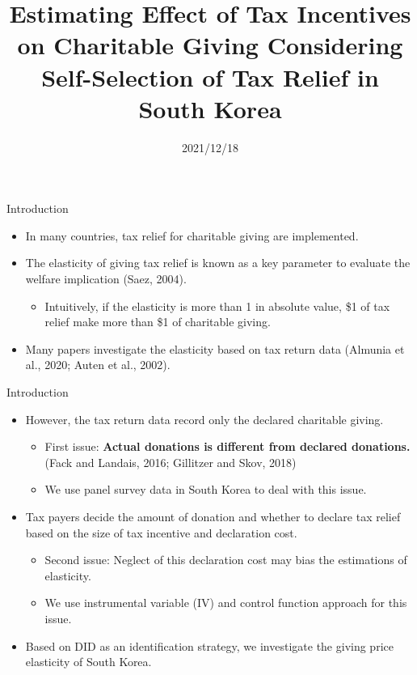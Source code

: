 \documentclass[
  ignorenonframetext,
  aspectratio=169,
]{beamer}
\title{Estimating Effect of Tax Incentives on Charitable Giving Considering Self-Selection of Tax Relief in South Korea  }
\author[shortname]{ Hiroki Kato \inst{1} \and  Tsuyoshi Goto \inst{2} \and  Yong-Rok Kim \inst{3} \and }
\institute[shortinst]{ \inst{1} Osaka University \and  \inst{2} Chiba University \and  \inst{3} Kansai University \and }
\date{2021/12/18}
\providecommand{\tightlist}{%
  \setlength{\itemsep}{0pt}\setlength{\parskip}{0pt}}
\begin{document}
\frame{\titlepage}

\begin{frame}{Introduction}
\protect\hypertarget{introduction}{}
\begin{itemize}
\tightlist
\item
  In many countries, tax relief for charitable giving are implemented.
\item
  The elasticity of giving tax relief is known as a key parameter to evaluate the welfare implication (Saez, 2004).

  \begin{itemize}
  \tightlist
  \item
    Intuitively, if the elasticity is more than 1 in absolute value, \$1 of tax relief make more than \$1 of charitable giving.
  \end{itemize}
\item
  Many papers investigate the elasticity based on tax return data (Almunia et al., 2020; Auten et al., 2002).
\end{itemize}
\end{frame}

\begin{frame}{Introduction}
\protect\hypertarget{introduction-1}{}
\begin{itemize}
\tightlist
\item
  However, the tax return data record only the declared charitable giving.

  \begin{itemize}
  \tightlist
  \item
    First issue: \textbf{Actual donations is different from declared donations.} (Fack and Landais, 2016; Gillitzer and Skov, 2018)
  \item
    We use panel survey data in South Korea to deal with this issue.
  \end{itemize}
\item
  Tax payers decide the amount of donation and whether to declare tax relief based on the size of tax incentive and declaration cost.

  \begin{itemize}
  \tightlist
  \item
    Second issue: Neglect of this declaration cost may bias the estimations of elasticity.
  \item
    We use instrumental variable (IV) and control function approach for this issue.
  \end{itemize}
\item
  Based on DID as an identification strategy, we investigate the giving price elasticity of South Korea.
\end{itemize}
\end{frame}
\end{document}
